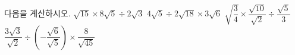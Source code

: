 다음을 계산하시오.
 $\sqrt{15}\times 8\sqrt{5}\div 2\sqrt{3}$
 $4\sqrt{5}\div 2\sqrt{18}\times 3\sqrt{6}$
 $\sqrt{\dfrac{3}{4}}\times\dfrac{\sqrt{10}}{\sqrt{2}}\div\dfrac{\sqrt{5}}{3}$
 $\dfrac{3\sqrt{3}}{\sqrt{2}}\div\left(-\dfrac{\sqrt{6}}{\sqrt{5}}\right)\times\dfrac{8}{\sqrt{45}}$

